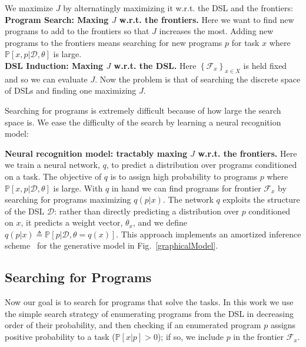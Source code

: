 \documentclass{article}
\newcommand{\system}{EC2.0~}
\newcommand{\probability}{\mathds{P}} %
\begin{document}
We maximize $J$ by alternatingly maximizing it w.r.t. the DSL and the frontiers:
\\\noindent \textbf{Program Search: Maxing $J$ w.r.t. the frontiers.} Here we
want to find new programs to add to  the frontiers so that $J$ increases the most.
Adding new programs to the frontiers means searching for new programs $p$ for task $x$
where $\probability[x,p|\mathcal{D},\theta]$ is large.
\\\noindent \textbf{DSL Induction: Maxing $J$ w.r.t. the DSL.} Here $\left\{\mathcal{F}_x \right\}_{x\in X}$ is held fixed and so we can evaluate $J$. Now the problem is that of searching the discrete space of DSLs and finding one maximizing $J$.

Searching for programs is extremely difficult because
of how large the search space is. We ease the difficulty of the search by learning a neural recognition model:

\textbf{Neural recognition model: tractably maxing $J$ w.r.t. the
  frontiers.}  Here we train a neural network, $q$, to predict a
distribution over programs conditioned on a task. The objective of $q$
is to assign high probability to programs $p$ where
$\probability[x,p|\mathcal{D},\theta]$ is large.  With $q$ in hand we can find programs for
frontier $\mathcal{F}_x$ by searching for programs maximizing
$q(p|x)$.
The network $q$ exploits the structure of the DSL $\mathcal{D}$:
rather than directly predicting a distribution over $p$ conditioned on $x$,
it predicts a weight vector, $\theta_x$, and we define $q(p|x)\triangleq \probability[p|\mathcal{D},\theta = q(x)]$.
This approach implements an amortized
inference scheme~\cite{ritchie2016deep} for the generative model in
Fig.~\ref{graphicalModel}.




\subsection{Searching for Programs}\label{explorationSection}

Now our goal is to search for programs that solve the tasks.  In this
work we use the simple search strategy of enumerating programs from
the DSL  in decreasing order of their probability,
and then checking if an enumerated program $p$ assigns positive
probability to a task ($\probability[x|p] > 0$); if so, we include $p$ in
the frontier $\mathcal{F}_x$.
\end{document}

